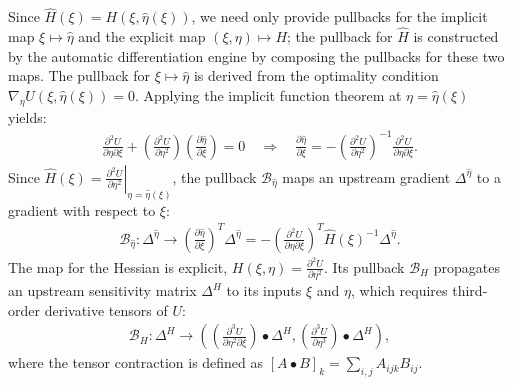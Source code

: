 \documentclass{article}
\begin{document}
Since $\hat{H}(\xi) = H(\xi, \hat{\eta}(\xi))$, we need only provide pullbacks for the implicit map $\xi \mapsto \hat{\eta}$ and the explicit map $(\xi, \eta) \mapsto H$; the pullback for $\hat{H}$ is constructed by the automatic differentiation engine by composing the pullbacks for these two maps.
The pullback for $\xi \mapsto \hat{\eta}$ is derived from the optimality condition $\nabla_\eta U(\xi, \hat{\eta}(\xi)) = 0$.
Applying the implicit function theorem at $\eta = \hat{\eta}(\xi)$ yields:
%
\begin{align}
  \frac{\partial^2 U}{\partial \eta \partial \xi} + \left(\frac{\partial^2 U}{\partial \eta^2}\right) \left(\frac{\partial \hat{\eta}}{\partial \xi}\right) = 0
  \quad \Rightarrow \quad
  \frac{\partial \hat{\eta}}{\partial \xi} = -\left(\frac{\partial^2 U}{\partial \eta^2}\right)^{-1} \frac{\partial^2 U}{\partial \eta \partial \xi}.
\end{align}
%
Since $\hat{H}(\xi) = \left. \frac{\partial^2 U}{\partial \eta^2} \right|_{\eta=\hat{\eta}(\xi)}$, the pullback $\mathcal{B}_{\hat{\eta}}$ maps an upstream gradient $\Delta^{\hat{\eta}}$ to a gradient with respect to $\xi$:
%
\begin{align}\label{eq:pullback-eta-hat}
  \mathcal{B}_{\hat{\eta}} : \Delta^{\hat{\eta}} \to \left(\frac{\partial \hat{\eta}}{\partial \xi}\right)^{T} \Delta^{\hat{\eta}}
  = -\left(\frac{\partial^2 U}{\partial \eta \partial \xi}\right)^{T} \hat{H}(\xi)^{-1} \Delta^{\hat{\eta}}.
\end{align}
%
The map for the Hessian is explicit, $H(\xi, \eta) = \frac{\partial^2 U}{\partial \eta^2}$.
Its pullback $\mathcal{B}_H$ propagates an upstream sensitivity matrix $\Delta^H$ to its inputs $\xi$ and $\eta$, which requires third-order derivative tensors of $U$:
%
\begin{align}\label{eq:pullback-H}
  \mathcal{B}_H : \Delta^H \to \left( \left(\frac{\partial^3 U}{\partial \eta^2 \partial \xi}\right) \bullet \Delta^H, \left(\frac{\partial^3 U}{\partial \eta^3}\right) \bullet \Delta^H \right),
\end{align}
%
where the tensor contraction is defined as $[A \bullet B]_k = \sum_{i,j} A_{ij k} B_{ij}$.
\end{document}
